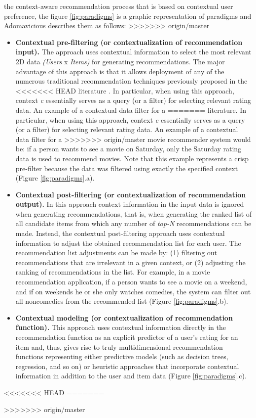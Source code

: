 the context-aware recommendation process that is based on contextual
user preference, the figure \ref{fig:paradigms} is a graphic representation of paradigms and Adomavicious describes them as follows:
>>>>>>> origin/master
\begin{itemize}
\item \textbf{Contextual pre-filtering (or contextualization of
recommendation input).} The approach uses contextual information to
select the most relevant 2D data \textit{(Users} x \textit{Items)} for generating
recommendations. The major advantage of this approach is that it
allows deployment of any of the numerous traditional recommendation
techniques previously proposed in the 
<<<<<<< HEAD
literature  \cite{adomavicius2005toward}.
In particular, when using this approach, context \textit{c} essentially 
serves as a query (or a filter) for selecting relevant rating data. 
An example of a contextual data filter for a
=======
literature\cite{adomavicius2005toward}.
In particular, when using this approach, context
\textit{c} essentially serves as a query (or a filter) for selecting
relevant rating data. An example of a contextual data filter for a
>>>>>>> origin/master
movie recommender system would be: if a person wants to see a movie on
Saturday, only the Saturday rating data is used to recommend movies.
Note that this example represents a crisp pre-filter because the data
was filtered using exactly the specified context (Figure \ref{fig:paradigms}.a).
\item \textbf{Contextual post-filtering (or contextualization of
recommendation output).} In this approach context information
in the input data is ignored when generating recommendations, that is, when
generating the ranked list of all candidate items from which any
number of \textit{top-N} recommendations can be made. Instead,  the
contextual post-filtering approach uses contextual information to
adjust the obtained recommendation list for each user. The
recommendation list adjustments can be made by: (1) filtering out
recommendations that are irrelevant in a given context, or (2)
adjusting the ranking of recommendations in the list. For example, in
a movie recommendation application, if a person wants to see a movie
on a weekend, and if on weekends he or she only watches comedies, the
system can filter out all noncomedies from the recommended list
(Figure  \ref{fig:paradigms}.b).
\item \textbf{Contextual modeling (or contextualization of
recommendation function).} This approach uses contextual information
directly in the recommendation function as an explicit predictor of a
user's rating for an item and, thus, gives rise to truly
multidimensional recommendation functions representing either
predictive models (such as decision trees, regression, and so on) or
heuristic approaches that incorporate contextual information in
addition to the user and item data (Figure  \ref{fig:paradigms}.c).
\end{itemize}
<<<<<<< HEAD
=======







>>>>>>> origin/master

